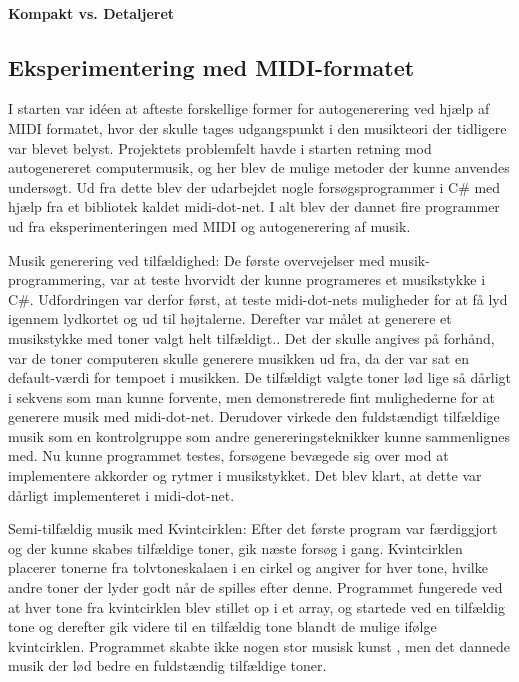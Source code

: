 \paragraph{Kompakt vs. Detaljeret}



\subsection {Eksperimentering med MIDI-formatet}
I starten var idéen at afteste forskellige former for autogenerering ved hjælp af MIDI formatet, hvor der skulle tages udgangspunkt i den musikteori der tidligere var blevet belyst. Projektets problemfelt havde i starten retning mod autogenereret computermusik, og her blev de mulige metoder der kunne anvendes undersøgt.     
Ud fra dette blev der udarbejdet nogle forsøgsprogrammer i C# med hjælp fra et bibliotek kaldet midi-dot-net.
I alt blev der dannet fire programmer ud fra eksperimenteringen med MIDI og autogenerering af musik.


Musik generering ved tilfældighed:
De første overvejelser med musik-programmering, var at teste hvorvidt der kunne programeres et musikstykke i C#. Udfordringen var derfor først, at teste midi-dot-nets muligheder for at få lyd igennem lydkortet og ud til højtalerne. Derefter var målet at generere et musikstykke med toner valgt helt tilfældigt.. Det der skulle angives på forhånd, var de toner computeren skulle generere musikken ud fra, da der var sat en default-værdi for tempoet i musikken.  
De tilfældigt valgte toner lød lige så dårligt i sekvens som man kunne forvente, men demonstrerede fint mulighederne for at generere musik med midi-dot-net. Derudover virkede den fuldstændigt tilfældige musik som en kontrolgruppe som andre genereringsteknikker kunne sammenlignes med. Nu kunne programmet testes, forsøgene bevægede sig over mod at implementere akkorder og rytmer i musikstykket. Det blev klart, at dette var dårligt implementeret i midi-dot-net. \cite{citation+needed}

Semi-tilfældig musik med Kvintcirklen:
Efter det første program var færdiggjort og der kunne skabes tilfældige toner, gik næste forsøg i gang. 
Kvintcirklen placerer tonerne fra tolvtoneskalaen i en cirkel og angiver for hver tone, hvilke andre toner der lyder godt når de spilles efter denne. Programmet fungerede ved at hver tone fra kvintcirklen blev stillet op i et array, og startede ved en tilfældig tone og derefter gik videre til en tilfældig tone blandt de mulige ifølge kvintcirklen. Programmet skabte ikke nogen stor musisk kunst , men det dannede musik der lød bedre en fuldstændig tilfældige toner. \cite{citation+needed}

